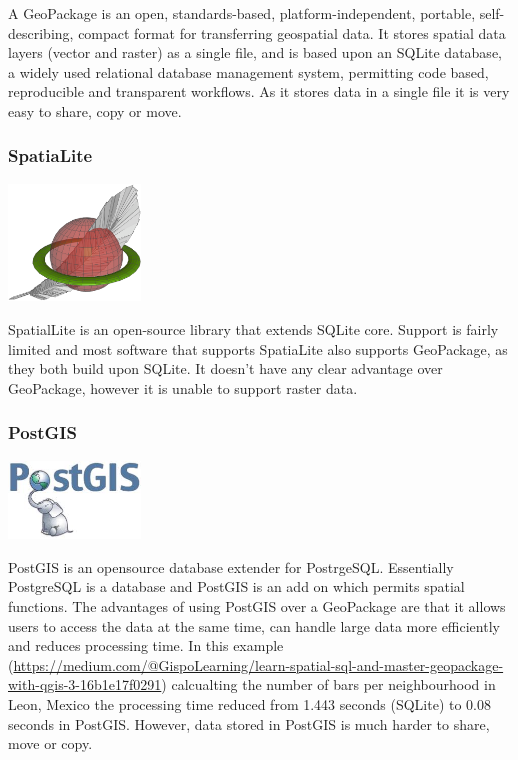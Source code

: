 \documentclass[]{book}
\begin{document}
A GeoPackage is an open, standards-based, platform-independent, portable, self-describing, compact format for transferring geospatial data. It stores spatial data layers (vector and raster) as a single file, and is based upon an SQLite database, a widely used relational database management system, permitting code based, reproducible and transparent workflows. As it stores data in a single file it is very easy to share, copy or move.

\hypertarget{spatialite}{%
\subsubsection{SpatiaLite}\label{spatialite}}

\begin{center}\includegraphics[width=100pt]{prac1_images/spatialite} \end{center}

SpatialLite is an open-source library that extends SQLite core. Support is fairly limited and most software that supports SpatiaLite also supports GeoPackage, as they both build upon SQLite. It doesn't have any clear advantage over GeoPackage, however it is unable to support raster data.

\hypertarget{postgis}{%
\subsubsection{PostGIS}\label{postgis}}

\begin{center}\includegraphics[width=100pt]{prac1_images/postGIS} \end{center}

PostGIS is an opensource database extender for PostrgeSQL. Essentially PostgreSQL is a database and PostGIS is an add on which permits spatial functions. The advantages of using PostGIS over a GeoPackage are that it allows users to access the data at the same time, can handle large data more efficiently and reduces processing time. In this example (\url{https://medium.com/@GispoLearning/learn-spatial-sql-and-master-geopackage-with-qgis-3-16b1e17f0291}) calcualting the number of bars per neighbourhood in Leon, Mexico the processing time reduced from 1.443 seconds (SQLite) to 0.08 seconds in PostGIS. However, data stored in PostGIS is much harder to share, move or copy.
\end{document}
